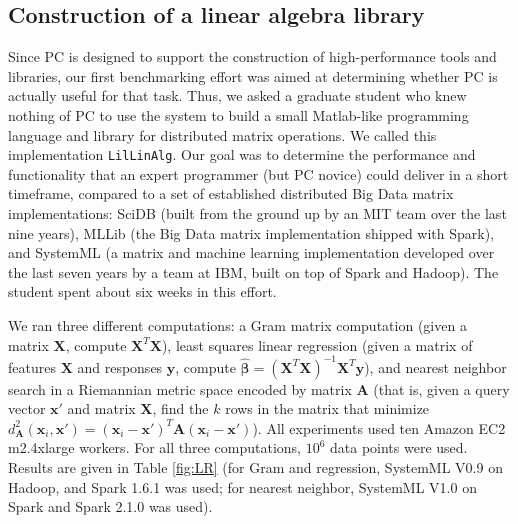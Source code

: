 \subsection {Construction of a linear algebra library}
Since PC is designed to support the construction
of high-performance tools and libraries, our first benchmarking effort was aimed at determining 
whether PC is actually useful for that task.  Thus, we asked
a graduate student who knew nothing of PC to use the system to build a small Matlab-like 
programming language and library for distributed matrix operations.
We called this implementation \texttt{LilLinAlg}.
Our goal was to determine the 
performance and functionality that an expert programmer (but PC novice) could deliver in a short
timeframe, compared to a set of established distributed Big Data matrix implementations:
SciDB \cite{brown2010overview, stonebraker2011architecture} (built from the ground up by an MIT team over the last nine years), MLLib \cite{meng2016mllib} 
(the Big Data matrix
implementation shipped with Spark), and SystemML \cite{boehm2014hybrid, ghoting2011systemml, boehm2016systemml}
(a matrix and machine learning implementation developed
over the last seven years by a team at IBM, built on top of Spark and Hadoop).
The student spent about six weeks in this effort.

We ran three different computations:
a Gram matrix computation (given a matrix $\textbf{X}$, compute
$\textbf{X}^T \textbf{X}$), least squares linear regression (given a matrix of features $\textbf{X}$ and
responses $\textbf{y}$, compute 
$\hat{\pmb{\beta}} = (\textbf{X}^{T} \textbf{X})^{-1} \textbf{X}^{T} \textbf{y}$), and nearest
neighbor search in a Riemannian metric space \cite{lebanon2006metric} encoded by matrix $\textbf{A}$ (that is,
given a query vector
$\textbf{x}'$ and matrix $\textbf{X}$, find the $k$ rows in the matrix that minimize 
$d_{\textbf{A}}^2(\textbf{x}_i, \textbf{x}') = 
(\textbf{x}_i - \textbf{x}')^T\textbf{A}(\textbf{x}_i - \textbf{x}')$).  All experiments used
ten Amazon
EC2 m2.4xlarge workers.  For
all three computations, 
$10^6$ data points were used.  Results are given in 
Table \ref{fig:LR} (for Gram and regression, SystemML V0.9 on Hadoop,
and Spark 1.6.1 was used; for
nearest neighbor, SystemML V1.0 on Spark and Spark 2.1.0 was used).


